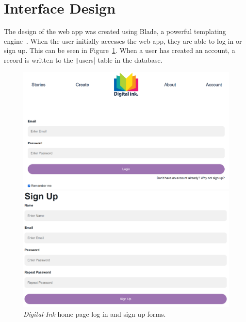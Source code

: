 \clearpage
\section{Interface Design}\label{sec:interface}

The design of the web app was created using Blade, a powerful templating engine~\parencite{laravel2022blade}.
When the user initially accesses the web app, they are able to log in or sign up.
This can be seen in Figure~\ref{fig:digital-ink-home-and-sign-up}.
When a user has created an account, a record is written to the \texttt|users| table in the database.

\begin{figure}[!htbp]
    \centering
    \begin{subfloat}
        \includegraphics[width=\textwidth]{resources/webapp/digital-ink-home}
    \end{subfloat}
    \begin{subfloat}
        \includegraphics[width=\textwidth]{resources/webapp/digital-ink-sign-up}
    \end{subfloat}
    \caption{\textit{Digital-Ink} home page log in and sign up forms.}
    \label{fig:digital-ink-home-and-sign-up}
\end{figure}

